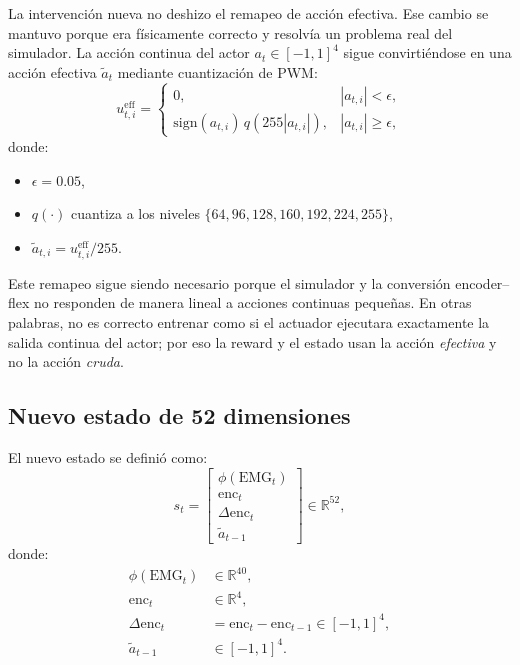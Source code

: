 \documentclass[11pt,a4paper]{article}
\begin{document}
La intervenci\'on nueva no deshizo el remapeo de acci\'on efectiva. Ese cambio se mantuvo porque era f\'isicamente correcto y resolv\'ia un problema real del simulador. La acci\'on continua del actor \(a_t \in [-1,1]^4\) sigue convirti\'endose en una acci\'on efectiva \(\tilde{a}_t\) mediante cuantizaci\'on de PWM:
\begin{equation}
u_{t,i}^{\mathrm{eff}} =
\begin{cases}
0, & |a_{t,i}| < \epsilon, \\
\mathrm{sign}(a_{t,i})\, q\!\left(255|a_{t,i}|\right), & |a_{t,i}| \ge \epsilon,
\end{cases}
\label{eq:effective_pwm_new}
\end{equation}
donde:
\begin{itemize}[leftmargin=1.2cm]
    \item \(\epsilon = 0.05\),
    \item \(q(\cdot)\) cuantiza a los niveles \(\{64, 96, 128, 160, 192, 224, 255\}\),
    \item \(\tilde{a}_{t,i} = u_{t,i}^{\mathrm{eff}} / 255\).
\end{itemize}

Este remapeo sigue siendo necesario porque el simulador y la conversi\'on encoder--flex no responden de manera lineal a acciones continuas peque\~nas. En otras palabras, no es correcto entrenar como si el actuador ejecutara exactamente la salida continua del actor; por eso la reward y el estado usan la acci\'on \emph{efectiva} y no la acci\'on \emph{cruda}.

\subsection{Nuevo estado de 52 dimensiones}

El nuevo estado se defini\'o como:
\begin{equation}
s_t =
\begin{bmatrix}
\phi(\mathrm{EMG}_t) \\
\mathrm{enc}_t \\
\Delta \mathrm{enc}_t \\
\tilde{a}_{t-1}
\end{bmatrix}
\in \mathbb{R}^{52},
\label{eq:state52}
\end{equation}
donde:
\begin{align}
\phi(\mathrm{EMG}_t) &\in \mathbb{R}^{40}, \\
\mathrm{enc}_t &\in \mathbb{R}^{4}, \\
\Delta \mathrm{enc}_t &= \mathrm{enc}_t - \mathrm{enc}_{t-1} \in [-1,1]^4, \\
\tilde{a}_{t-1} &\in [-1,1]^4.
\end{align}
\end{document}
